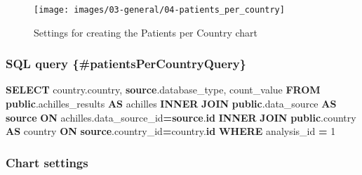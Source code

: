 \documentclass[
]{book}
\newenvironment{Shaded}{\begin{snugshade}}{\end{snugshade}}
\newcommand{\DecValTok}[1]{\textcolor[rgb]{0.00,0.00,0.81}{#1}}
\newcommand{\KeywordTok}[1]{\textcolor[rgb]{0.13,0.29,0.53}{\textbf{#1}}}
\newcommand{\NormalTok}[1]{#1}
\newcommand{\OperatorTok}[1]{\textcolor[rgb]{0.81,0.36,0.00}{\textbf{#1}}}
\begin{document}
\begin{figure}
\texttt{[image: images/03-general/04-patients\_per\_country]} \caption{Settings for creating the Patients per Country chart}\label{fig:patientsPerCountry}
\end{figure}

\hypertarget{sql-query-patientspercountryquery}{%
\subsubsection*{SQL query \{\#patientsPerCountryQuery\}}\label{sql-query-patientspercountryquery}}

\begin{Shaded}
\begin{Highlighting}[]
\KeywordTok{SELECT}\NormalTok{ country.country,}
       \KeywordTok{source}\NormalTok{.database\_type,}
\NormalTok{       count\_value}
\KeywordTok{FROM} \KeywordTok{public}\NormalTok{.achilles\_results }\KeywordTok{AS}\NormalTok{ achilles }
\KeywordTok{INNER} \KeywordTok{JOIN} \KeywordTok{public}\NormalTok{.data\_source }\KeywordTok{AS} \KeywordTok{source} \KeywordTok{ON}\NormalTok{ achilles.data\_source\_id}\OperatorTok{=}\KeywordTok{source}\NormalTok{.}\KeywordTok{id}
\KeywordTok{INNER} \KeywordTok{JOIN} \KeywordTok{public}\NormalTok{.country }\KeywordTok{AS}\NormalTok{ country }\KeywordTok{ON} \KeywordTok{source}\NormalTok{.country\_id}\OperatorTok{=}\NormalTok{country.}\KeywordTok{id}
\KeywordTok{WHERE}\NormalTok{ analysis\_id }\OperatorTok{=} \DecValTok{1}
\end{Highlighting}
\end{Shaded}

\hypertarget{chart-settings-3}{%
\subsubsection*{Chart settings}\label{chart-settings-3}}
\end{document}
